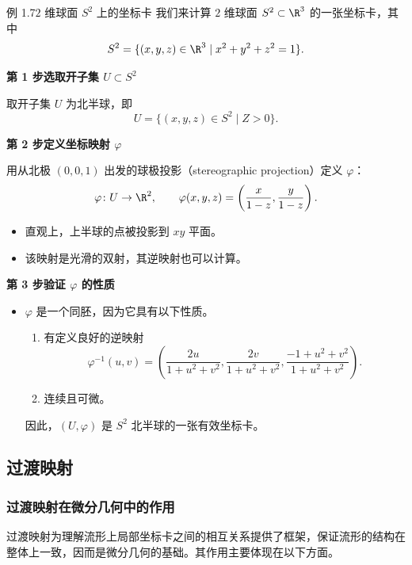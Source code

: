 \begin{statement}{例 1.7}{$2$ 维球面 $S^2$ 上的坐标卡}
我们来计算 $2$ 维球面 $S^2\subset\R^3$ 的一张坐标卡，其中
\[
  S^2=\{(x,y,z)\in\R^3\mid x^2+y^2+z^2=1\}.
\]

\textbf{第 1 步\quad 选取开子集 $U\subset S^2$}\par
取开子集 $U$ 为北半球，即
\[
  U=\{(x,y,z)\in S^2\mid Z>0\}.
\]

\textbf{第 2 步\quad 定义坐标映射 $\varphi$}\par
用从北极 $(0,0,1)$ 出发的球极投影（stereographic projection）定义 $\varphi$：
\[
  \varphi\colon U\to\R^2,\qquad
  \varphi(x,y,z)=\left(\frac{x}{1-z},\frac{y}{1-z}\right).
\]
\begin{itemize}
  \item 直观上，上半球的点被投影到 $xy$ 平面。
  \item 该映射是光滑的双射，其逆映射也可以计算。
\end{itemize}

\textbf{第 3 步\quad 验证 $\varphi$ 的性质}
\begin{itemize}
  \item $\varphi$ 是一个同胚，因为它具有以下性质。
  \begin{enumerate}
    \item 有定义良好的逆映射
    \[
      \varphi^{-1}(u,v)
      =\left(\frac{2u}{1+u^2+v^2},\frac{2v}{1+u^2+v^2},
          \frac{-1+u^2+v^2}{1+u^2+v^2}\right).
    \]
    \item 连续且可微。
  \end{enumerate}
  因此，$(U,\varphi)$ 是 $S^2$ 北半球的一张有效坐标卡。
\end{itemize}
\end{statement}

\subsection{过渡映射}
\subsubsection{过渡映射在微分几何中的作用}
过渡映射为理解流形上局部坐标卡之间的相互关系提供了框架，保证流形的结构在整体上一致，因而是微分几何的基础。其作用主要体现在以下方面。

